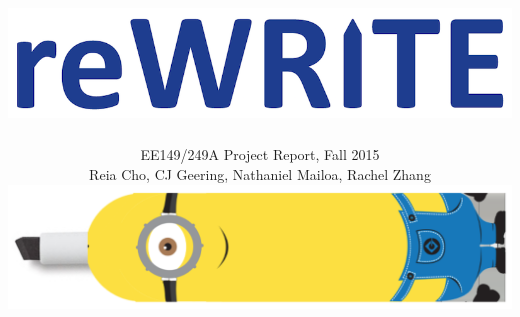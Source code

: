 \documentclass[10pt,journal]{IEEEtran}
\begin{document}
\title{\includegraphics[width=0.4\linewidth]{figures/rewrite}}

\author{EE149/249A Project Report, Fall 2015

Reia Cho, CJ Geering, Nathaniel Mailoa, Rachel Zhang

\includegraphics[width=0.45\linewidth]{figures/minion}}


\maketitle
\end{document}
